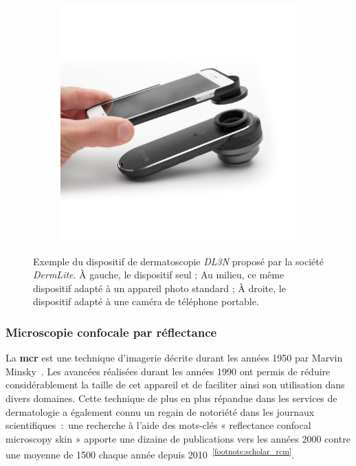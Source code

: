 \begin{figure}[H]
\begin{subfigure}{.32\textwidth}
    \end{subfigure}
    \begin{subfigure}{.32\textwidth}
      \centering
      \includegraphics[width=\linewidth]{contents/chapter_2/resources/example_device_dermlite_3.png}
    \end{subfigure}
    \caption{Exemple du dispositif de dermatoscopie \textit{DL3N} proposé par la société \textit{DermLite}. À gauche, le dispositif seul ; Au milieu, ce même dispositif adapté à un appareil photo standard ; À droite, le dispositif adapté à une caméra de téléphone portable.}
    \label{fig:example_device_dermlite}
\end{figure}\par

\subsubsection{Microscopie confocale par réflectance}
La \textbf{\acrfull{mcr}} est une technique d’imagerie décrite durant les années 1950 par Marvin Minsky~\cite{Sheppard2015}. Les avancées réalisées durant les années 1990 ont permis de réduire considérablement la taille de cet appareil et de faciliter ainsi son utilisation dans divers domaines. Cette technique de plus en plus répandue dans les services de dermatologie a également connu un regain de notoriété dans les journaux scientifiques~:~une recherche à l’aide des mots-clés « reflectance confocal microscopy skin » apporte une dizaine de publications vers les années 2000 contre une moyenne de 1500 chaque année depuis 2010~\textsuperscript{\ref{footnote:scholar_rcm}}.\par

